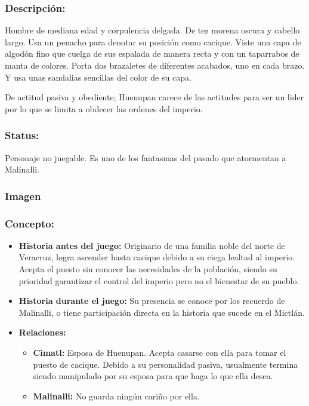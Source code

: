 \documentclass[11pt,letterpaper]{article}
\begin{document}
\subsubsection{Descripción:} 
Hombre de mediana edad y corpulencia delgada. De tez morena oscura y cabello largo. Usa un penacho para denotar su posición como cacique. Viste una capa de algodón fino que cuelga de sus espalada de manera recta y con un taparrabos de manta de colores. Porta dos brazaletes de diferentes acabados, uno en cada brazo. Y usa unas sandalias sencillas del color de su capa.     
\\
\par
De actitud pasiva y obediente; Huenupan carece de las actitudes para ser un lider por lo que se limita a obdecer las ordenes del imperio. 
\subsubsection{Status:}
Personaje no juegable.
Es uno de los fantasmas del pasado que atormentan a Malinalli.
\subsubsection{Imagen}
\subsubsection{Concepto:}
\begin{itemize}
	\item \textbf{Historia antes del juego:}
	Originario de una familia noble del  norte de Veracruz, logra ascender hasta cacique debido a su ciega lealtad al imperio. Acepta el puesto sin conocer las necesidades de la población, siendo su prioridad garantizar el control del imperio pero no el bienestar de su pueblo.  
	\item \textbf{Historia durante el juego:}
	Su presencia se conoce por los recuerdo de Malinalli, o tiene participación directa en la historia que sucede en el Mictlán.
	\item \textbf{Relaciones:}
	\begin{itemize}
		\item \textbf{Cimatl:} Esposa de Huenupan. Acepta casarse con ella para tomar el puesto de cacique. Debido a su personalidad pasiva, usualmente termina siendo manipulado por su esposa para que haga lo que ella desea. 
		\item \textbf{Malinalli:} No guarda ningún cariño por ella. 
	\end{itemize}                     
\end{itemize}
\end{document}
